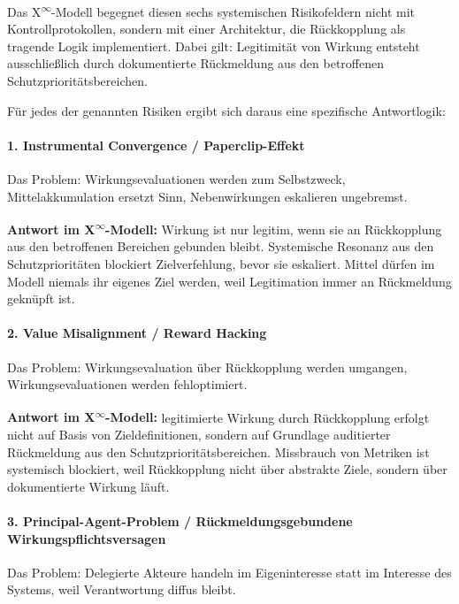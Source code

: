 \documentclass[12pt,a4paper]{article}
\begin{document}
Das \texorpdfstring{X\textsuperscript{\(\infty\)}}{X-Infinity}-Modell begegnet diesen sechs systemischen Risikofeldern nicht mit Kontrollprotokollen, sondern mit einer Architektur, die Rückkopplung als tragende Logik implementiert.  
Dabei gilt: Legitimität von Wirkung entsteht ausschließlich durch dokumentierte Rückmeldung aus den betroffenen Schutzprioritätsbereichen.

Für jedes der genannten Risiken ergibt sich daraus eine spezifische Antwortlogik:

\paragraph{1. Instrumental Convergence / Paperclip-Effekt}

Das Problem:  
Wirkungsevaluationen werden zum Selbstzweck, Mittelakkumulation ersetzt Sinn, Nebenwirkungen eskalieren ungebremst.

\textbf{Antwort im X\textsuperscript{\(\infty\)}-Modell:}  
Wirkung ist nur legitim, wenn sie an Rückkopplung aus den betroffenen Bereichen gebunden bleibt.  
Systemische Resonanz aus den Schutzprioritäten blockiert Zielverfehlung, bevor sie eskaliert.  
Mittel dürfen im Modell niemals ihr eigenes Ziel werden, weil Legitimation immer an Rückmeldung geknüpft ist.

\paragraph{2. Value Misalignment / Reward Hacking}

Das Problem:  
Wirkungsevaluation über Rückkopplung werden umgangen, Wirkungsevaluationen werden fehloptimiert.

\textbf{Antwort im X\textsuperscript{\(\infty\)}-Modell:}  
legitimierte Wirkung durch Rückkopplung erfolgt nicht auf Basis von Zieldefinitionen, sondern auf Grundlage auditierter Rückmeldung aus den Schutzprioritätsbereichen.  
Missbrauch von Metriken ist systemisch blockiert, weil Rückkopplung nicht über abstrakte Ziele, sondern über dokumentierte Wirkung läuft.

\paragraph{3. Principal-Agent-Problem / Rückmeldungsgebundene Wirkungspflichtsversagen}

Das Problem:  
Delegierte Akteure handeln im Eigeninteresse statt im Interesse des Systems, weil Verantwortung diffus bleibt.
\end{document}
